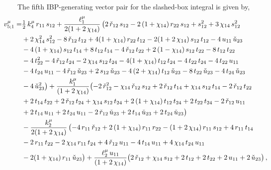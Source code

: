 \documentclass[aps,prd,preprint,groupedaddress,nofootinbib,showpacs,eqsecnum]{revtex4}
\begin{document}
The fifth IBP-generating vector pair for the slashed-box integral is
given by,
\begin{equation}
\begin{aligned}
\hspace*{-7mm}v_{5;1}^\mu = &
\tfrac{1}{2}\,k_{4}^\mu\,r_{11}\,s_{12}
+\frac{\ell_1^\mu}{2(1+2\,\chi_{14})}
\,\bigl(2\,\rs_{12}\,s_{12}-2\,(1+\chi_{14})\,r_{22}\,s_{12}
+s_{12}^{2}+3\,\chi_{14}\,s_{12}^{2}
\\ &
+2\,\chi_{14}^{2}\,s_{12}^{2}-8\,\rs_{12}\,t_{12}
+4(1+\chi_{14})\,r_{22}\,t_{12}
-2(1+2\,\chi_{14})\,s_{12}\,t_{12}
-4\,u_{11}\,\us_{23}
\\ &
-4\,(1+\chi_{14})\,s_{12}\,t_{14}+8\,t_{12}\,t_{14}
-4\,\rs_{12}\,t_{22}+2\,(1-\chi_{14})\,s_{12}\,t_{22}
-8\,t_{12}\,t_{22}
\\ &
-4\,t_{22}^{2}-4\,\rs_{12}\,t_{24}
-2\,\chi_{14}\,s_{12}\,t_{24}
-4(1+\chi_{14})\,t_{12}\,t_{24}-4\,t_{22}\,t_{24}
-4\,t_{22}\,u_{11}
\\ &
-4\,t_{24}\,u_{11}-4\,\rs_{12}\,\us_{23}
+2\,s_{12}\,\us_{23}-4\,(2+\chi_{14})\,t_{12}\,\us_{23}
-8\,t_{22}\,\us_{23}
-4\,t_{24}\,\us_{23}
\\ &
-4\,\us_{23}^{2}\bigr)
+\frac{k_{1}^\mu}{(1+2\,\chi_{14})}
\bigl(-2\,\rs_{12}^{2}-\chi_{14}\,\rs_{12}\,s_{12}
+2\,\rs_{12}\,t_{14}+\chi_{14}\,s_{12}\,t_{14}
-2\,\rs_{12}\,t_{22}
\\ &
+2\,t_{14}\,t_{22}
+2\,\rs_{12}\,t_{24}
+\chi_{14}\,s_{12}\,t_{24}
+2\,(1+\chi_{14})\,t_{12}\,t_{24}
+2\,t_{22}\,t_{24}
-2\,\rs_{12}\,u_{11}
\\ &
+2\,t_{14}\,u_{11}+2\,t_{24}\,u_{11}
-2\,\rs_{12}\,\us_{23}+2\,t_{14}\,\us_{23}+2\,t_{24}\,\us_{23}\bigr)\,
\\ &
-\frac{k_{2}^\mu}{2(1+2\,\chi_{14})}
\,\bigl(-4\,r_{11}\,\rs_{12}
+2\,(1+\chi_{14})\,r_{11}\,r_{22}
-(1+2\,\chi_{14})\,r_{11}\,s_{12}+4\,r_{11}\,t_{14}
\\ &
-2\,r_{11}\,t_{22}-2\,\chi_{14}\,r_{11}\,t_{24}
+4\,\rs_{12}\,u_{11}-4\,t_{14}\,u_{11}
+4\,\chi_{14}\,t_{24}\,u_{11}
\\ &
-2(1+\chi_{14})\,r_{11}\,\us_{23}\bigr)
+\frac{\ell_2^\mu\,u_{11}}{(1+2\,\chi_{14})}
\bigl(2\,\rs_{12}+\chi_{14}\,s_{12}+2\,t_{12}+2\,t_{22}
+2\,u_{11}+2\,\us_{23}\bigr)
\,,\\
\end{aligned}
\label{SlashedBoxFifthVectorA}
\end{equation}
\end{document}
